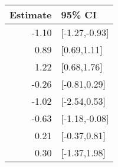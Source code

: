 \begin{tabular}{rl}
  \hline
Estimate & 95\% CI \\ 
  \hline
-1.10 & [-1.27,-0.93] \\ 
  0.89 & [0.69,1.11] \\ 
  1.22 & [0.68,1.76] \\ 
  -0.26 & [-0.81,0.29] \\ 
  -1.02 & [-2.54,0.53] \\ 
  -0.63 & [-1.18,-0.08] \\ 
  0.21 & [-0.37,0.81] \\ 
  0.30 & [-1.37,1.98] \\ 
   \hline
\end{tabular}

